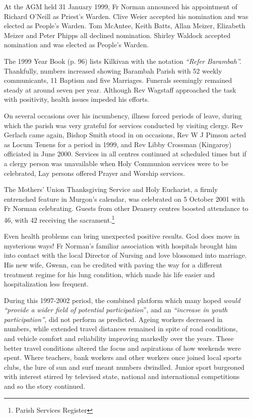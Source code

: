 At the AGM held 31 January 1999, Fr Norman announced his appointment of Richard O'Neill as Priest's Warden. Clive Weier accepted his nomination and was elected as People's Warden. Tom McAntee, Keith Batts, Allan Meizer, Elizabeth Meizer and Peter Phipps all declined nomination. Shirley Waldock accepted nomination and was elected as People's Warden.



The 1999 Year Book (p. 96) lists Kilkivan with the notation \emph{``Refer Barambah''.} Thankfully, numbers increased showing Barambah Parish with 52 weekly communicants, 11 Baptism and five Marriages. Funerals seemingly remained steady at around seven per year. Although Rev Wagstaff approached the task with positivity, health issues impeded his efforts.



On several occasions over his incumbency, illness forced periods of leave, during which the parish was very grateful for services conducted by visiting clergy. Rev Gerlach came again, Bishop Smith stood in on occasions, Rev W J Pimson acted as Locum Tenens for a period in 1999, and Rev Libby Crossman (Kingaroy) officiated in June 2000. Services in all centres continued at scheduled times but if a clergy person was unavailable when Holy Communion services were to be celebrated, Lay persons offered Prayer and Worship services.



The Mothers' Union Thanksgiving Service and Holy Eucharist, a firmly entrenched feature in Murgon's calendar, was celebrated on 5 October 2001 with Fr Norman celebrating. Guests from other Deanery centres boosted attendance to 46, with 42 receiving the sacrament.\footnote{Parish Services Register}


Even health problems can bring unexpected positive results. God does move in mysterious ways! Fr Norman's familiar association with hospitals brought him into contact with the local Director of Nursing and love blossomed into marriage. His new wife, Gwenn, can be credited with paving the way for a different treatment regime for his lung condition, which made his life easier and hospitalization less frequent.



During this 1997-2002 period, the combined platform which many hoped \emph{would ``provide a wider field of potential participation}'', and an \emph{``increase in youth participation''}, did not perform as predicted. Ageing workers decreased in numbers, while extended travel distances remained in spite of road conditions, and vehicle comfort and reliability improving markedly over the years. These better travel conditions altered the focus and aspirations of how weekends were spent. Where teachers, bank workers and other workers once joined local sports clubs, the lure of sun and surf meant numbers dwindled. Junior sport burgeoned with interest stirred by televised state, national and international competitions and so the story continued.



